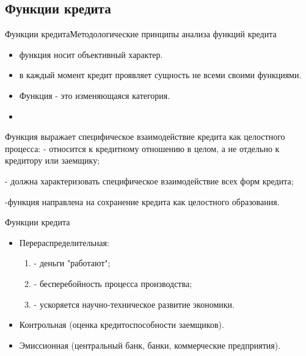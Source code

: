 \documentclass[_DKB_p2_Credit.tex]{subfiles}
\begin{document}

\subsection{Функции кредита}
\begin{frame}{Функции кредита}{Методологические принципы анализа функций кредита}
\begin{itemize}
\item
функция носит объективный характер.
\item
в каждый момент кредит проявляет сущность не всеми своими функциями.
\item
Функция - это изменяющаяся категория.
\item
\end{itemize}
\end{frame}

\begin{frame}
Функция выражает специфическое взаимодействие кредита как целостного процесса:
	- относится к кредитному отношению в целом, а не отдельно к кредитору или заемщику;
	
	- должна характеризовать специфическое взаимодействие всех форм кредита;
	
	-функция направлена на сохранение кредита как целостного образования.
\end{frame}

\begin{frame}{Функции кредита}
\begin{itemize}[<+->]
\item
Перераспределительная:
\begin{enumerate}
\item
- деньги "работают";
\item
- бесперебойность процесса производства;
\item
- ускоряется научно-техническое развитие экономики.
\end{enumerate}
\item
Контрольная (оценка кредитоспособности заемщиков).
\item
Эмиссионная (центральный банк, банки, коммерческие предприятия).
\end{itemize}
\end{frame}
\end{document}

